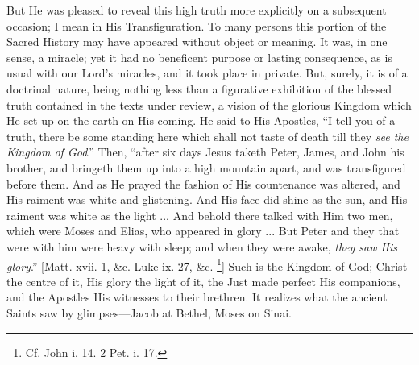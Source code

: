 But He was pleased to reveal this high truth more explicitly on a
subsequent occasion; I mean in His Transfiguration. To many persons
this portion of the Sacred History may have appeared without object or
meaning. It was, in one sense, a miracle; yet it had no beneficent
purpose or lasting consequence, as is usual with our Lord's
miracles, and it took place in private. But, surely, it is of a
doctrinal nature, being nothing less than a figurative exhibition of
the blessed truth contained in the texts under review, a vision of the
glorious Kingdom which He set up on the earth on His coming. He said
to His Apostles, ``I tell you of a truth, there be some standing
here which shall not taste of death till they \emph{see the Kingdom of
God}.'' Then, ``after six days Jesus taketh Peter, James,
and John his brother, and bringeth them up into a high mountain apart,
and was transfigured before them. And as He prayed the fashion of His
countenance was altered, and His raiment was white and glistening. And
His face did shine as the sun, and His raiment was white as the light
... And behold there talked with Him two men, which were Moses and
Elias, who appeared in glory ... But Peter and they that were with him
were heavy with sleep; and when they were awake, \emph{they saw His glory}.''
[Matt. xvii. 1, \&c. Luke ix. 27, \&c. \footnote{Cf. John i. 14. 2 Pet. i. 17.}]
Such is the Kingdom of God; Christ the centre of it, His glory the
light of it, the Just made perfect His companions, and the Apostles
His witnesses to their brethren. It realizes what the ancient Saints
saw by glimpses—Jacob at Bethel, Moses on Sinai.

